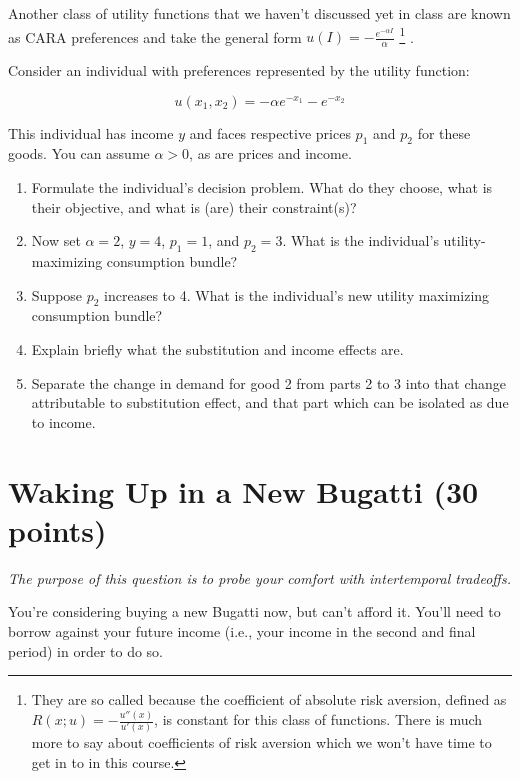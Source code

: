 \documentclass{article}
\begin{document}
Another class of utility functions that we haven't discussed yet in class are known as CARA preferences and take the general form $u(I) = -\frac{e^{-\alpha I}}{\alpha}$
\footnote{
	They are so called because the coefficient of absolute risk aversion, defined as $R(x; u) = -\frac{u''(x)}{u'(x)}$, is constant for this class of functions. There is much more to say about coefficients of risk aversion which we won't have time to get in to in this course.
}
.

Consider an individual with preferences represented by the utility function:

\[ u(x_1, x_2) = - \alpha e^{-x_1} - e^{-x_2} \]

This individual has income $y$ and faces respective prices $p_1$ and $p_2$ for these goods. You can assume $\alpha > 0$, as are prices and income.

\begin{enumerate}
\item Formulate the individual's decision problem. What do they choose, what is their objective, and what is (are) their constraint(s)?

\item Now set $\alpha = 2$, $y = 4$, $p_1 = 1$, and $p_2 = 3$. What is the individual's utility-maximizing consumption bundle?

\item Suppose $p_2$ increases to 4. What is the individual's new utility maximizing consumption bundle?

\item Explain briefly what the substitution and income effects are.

\item Separate the change in demand for good 2 from parts 2 to 3 into that change attributable to substitution effect, and that part which can be isolated as due to income.

\end{enumerate}

\section*{Waking Up in a New Bugatti (30 points)}

\small{\textit{The purpose of this question is to probe your comfort with intertemporal tradeoffs.}}

You're considering buying a new Bugatti now, but can't afford it. You'll need to borrow against your future income (i.e., your income in the second and final period) in order to do so.
\end{document}
